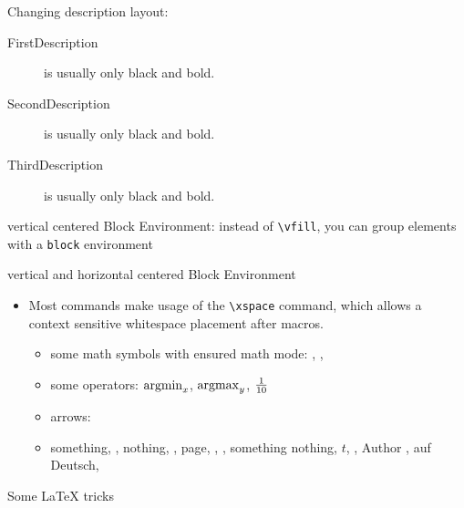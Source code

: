 \documentclass[11pt, a4paper, landscape]{article}
\begin{document}
\NewPage{}
\begin{block}
  Changing description layout:
  \begin{description}
  \item[FirstDescription] is usually only black and bold.
  \item[SecondDescription] is usually only black and bold.
  \item[ThirdDescription] is usually only black and bold.
  \end{description}
\end{block}

\begin{block}
  vertical centered Block Environment: instead of \texttt{\textbackslash vfill},
  you can group elements with a \texttt{block} environment
\end{block}

\begin{hvcenter}
  vertical and horizontal centered Block Environment
\end{hvcenter}

\begin{block}
  \begin{itemize}
  \item Most commands make usage of the \texttt{\textbackslash xspace} command, which
    allows a context sensitive whitespace placement after macros.
    \begin{itemize}
    \item some math symbols with ensured math mode: \nat, \rel, \congmod
    \item some operators: $\argmin_{x}$, $\argmax_{y}$, $\frac{1}{10}$
    \item arrows: \ra
    \item \eg something, \Eg, \ie nothing, \Ie, \cf page, \Cf, \etc, something
      \vs nothing, \wrt $t$, \dof, Author \etal, \zB auf Deutsch, \ZB
    \end{itemize}
  \end{itemize}
\end{block}

\NewPage{}
\vfill
Some \LaTeX\xspace tricks
\vfill
\end{document}
